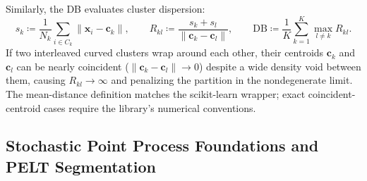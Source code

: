 Similarly, the \acf{DB} evaluates cluster dispersion:
\begin{equation}
  s_k \coloneqq \frac{1}{N_k}\sum_{i \in C_k} \|\mathbf{x}_i
  - \mathbf{c}_k\|, \qquad
  R_{kl} \coloneqq \frac{s_k + s_l}{\|\mathbf{c}_k - \mathbf{c}_l\|}, \qquad
  \mathrm{DB} \coloneqq \frac{1}{K}\sum_{k=1}^K \max_{l \ne k} R_{kl}.
\end{equation}
If two interleaved curved clusters wrap around each other, their centroids
$\mathbf{c}_k$ and $\mathbf{c}_l$ can be nearly coincident
($\|\mathbf{c}_k - \mathbf{c}_l\| \to 0$)
despite a wide density void between them, causing $R_{kl} \to \infty$ and
penalizing the partition in the nondegenerate limit. The mean-distance
definition matches the scikit-learn wrapper; exact coincident-centroid
cases require the library's numerical conventions.

\subsection{Stochastic Point Process Foundations and PELT Segmentation}
\label{subsec:supp_point_processes}

